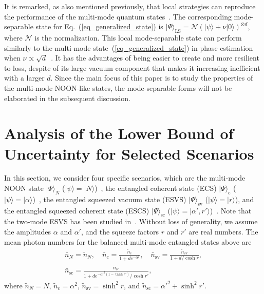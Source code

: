 \documentclass[aps,pra,reprint,showpacs,groupedaddress]{revtex4-1}
\begin{document}
It is remarked, as also mentioned previously, that local strategies can reproduce the performance of the multi-mode quantum states~\cite{Knott2016_modeseparablestate}.  The corresponding mode-separable state for Eq.~(\ref{eq_generalized_state}) is
$
    |\Psi\rangle_\text{LS}
    =
    \mathcal{N} \left(|\psi\rangle + \nu |0\rangle\right)^{\otimes d}
$,
where $\mathcal{N}$ is the normalization.  This local mode-separable state can perform similarly to the multi-mode state~(\ref{eq_generalized_state}) in phase estimation when $\nu \propto \sqrt{d}$~\cite{Knott2016_modeseparablestate}.  It has the advantages of being easier to create and more resilient to loss, despite of its large vacuum component that makes it increasing inefficient with a larger $d$.  Since the main focus of this paper is to study the properties of the multi-mode NOON-like states, the mode-separable forms will not be elaborated in the subsequent discussion.





\section{Analysis of the Lower Bound of Uncertainty for Selected Scenarios}
In this section, we consider four specific scenarios, which are the multi-mode NOON state $|\Psi\rangle_N$ ($|\psi\rangle=|N\rangle$)~\cite{Humphreys2013_multi_NOON_l}, the entangled coherent state (ECS) $|\Psi\rangle_\text{c}$ ($|\psi\rangle=|\alpha\rangle$)~\cite{Liu2016_multi_GeneralizedECS_lnl}, the entangled squeezed vacuum state (ESVS) $|\Psi\rangle_\text{sv}$ ($|\psi\rangle=|r\rangle$), and the entangled squeezed coherent state (ESCS) $|\Psi\rangle_\text{sc}$ ($|\psi\rangle=|\alpha',r'\rangle$)~\cite{Agarwal2013}.
Note that the two-mode ESVS has been studied in~\cite{Knott2016_single_squeezed, Lee2016_2mode_ESVS}.
Without loss of generality, we assume the amplitudes $\alpha$ and $\alpha'$, and the squeeze factors $r$ and $r'$ are real numbers.
The mean photon numbers for the balanced multi-mode entangled states above are
\begin{eqnarray}
    &\displaystyle
    \bar{n}_N = \tilde{n}_N ,
\quad
    \bar{n}_\text{c} = \frac{\tilde{n}_\text{c}}{1+d e^{-\alpha^2}} ,
\quad
    \bar{n}_\text{sv} = \frac{\tilde{n}_\text{sv}}{1+d /\cosh{r}} ,
    &
\nonumber\\
    &\displaystyle
    \bar{n}_\text{sc} = \frac{\tilde{n}_\text{sc}}{1+d e^{-\alpha'^2\left(1-\tanh r'\right)} /\cosh{r'}},
    &
    \label{eq_mean_photon_number_4}
\end{eqnarray}
where $\tilde{n}_N = N$, $\tilde{n}_\text{c} = \alpha^2$, $\tilde{n}_\text{sv} = \sinh^2{r}$, and $\tilde{n}_\text{sc} = \alpha'^2+\sinh^2{r'}$.
\end{document}
